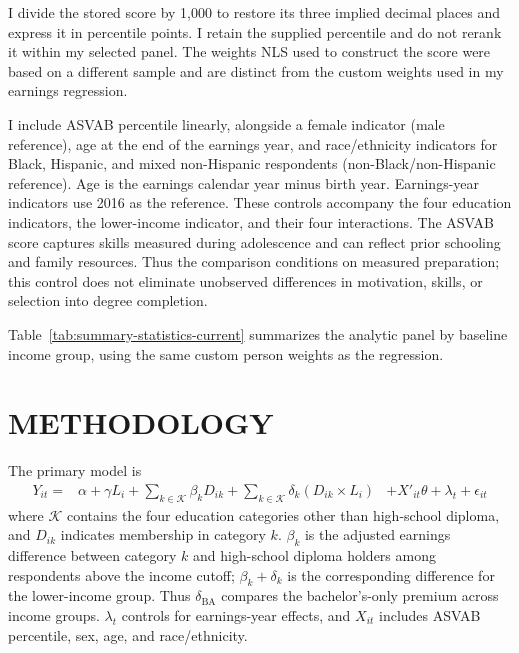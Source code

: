 \documentclass[12pt,letterpaper]{article}
\begin{document}
I divide the stored score by 1,000 to restore its three implied decimal places and
express it in percentile points. I retain the supplied percentile and do not rerank
it within my selected panel. The weights NLS used to construct the score were based
on a different sample and are
distinct from the custom weights used in my earnings regression.\newline

I include ASVAB percentile linearly, alongside a female indicator (male reference),
age at the end of the earnings year, and race/ethnicity indicators for Black,
Hispanic, and mixed non-Hispanic respondents (non-Black/non-Hispanic reference).
Age is the earnings calendar year minus birth year. Earnings-year indicators use
2016 as the reference. These controls accompany the four education indicators,
the lower-income indicator, and their four interactions. The ASVAB score captures skills measured during
adolescence and can reflect prior schooling and family resources. Thus the
comparison conditions on measured preparation; this control does not eliminate
unobserved differences in motivation, skills, or selection into degree completion.\newline

Table~\ref{tab:summary-statistics-current} summarizes the analytic panel by baseline
income group, using the same custom person weights as the regression.

\FloatBarrier

\section*{METHODOLOGY}

The primary model is
\[
\begin{aligned}
    Y_{it}={}&\alpha+\gamma L_i+\sum_{k\in\mathcal K}\beta_k D_{ik}
              +\sum_{k\in\mathcal K}\delta_k(D_{ik}\times L_i)
             &+X'_{it}\theta+\lambda_t+\epsilon_{it}
\end{aligned}
\]
where $\mathcal K$ contains the four education categories other than high-school
diploma, and $D_{ik}$ indicates membership in category $k$. $\beta_k$ is the adjusted
earnings difference between category $k$ and high-school diploma holders among
respondents above the income cutoff; $\beta_k+\delta_k$ is the corresponding
difference for the lower-income group. Thus $\delta_{\mathrm{BA}}$ compares the
bachelor's-only premium across income groups. $\lambda_t$ controls for earnings-year
effects, and $X_{it}$ includes ASVAB percentile, sex, age, and race/ethnicity.\newline
\end{document}
